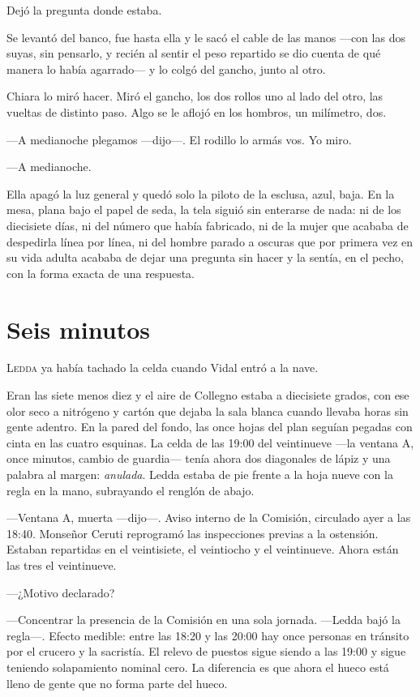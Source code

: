 Dejó la pregunta donde estaba.

Se levantó del banco, fue hasta ella y le sacó el cable de las manos ---con las dos suyas, sin pensarlo, y recién al sentir el peso repartido se dio cuenta de qué manera lo había agarrado--- y lo colgó del gancho, junto al otro.

Chiara lo miró hacer. Miró el gancho, los dos rollos uno al lado del otro, las vueltas de distinto paso. Algo se le aflojó en los hombros, un milímetro, dos.

---A medianoche plegamos ---dijo---. El rodillo lo armás vos. Yo miro.

---A medianoche.

Ella apagó la luz general y quedó solo la piloto de la esclusa, azul, baja. En la mesa, plana bajo el papel de seda, la tela siguió sin enterarse de nada: ni de los diecisiete días, ni del número que había fabricado, ni de la mujer que acababa de despedirla línea por línea, ni del hombre parado a oscuras que por primera vez en su vida adulta acababa de dejar una pregunta sin hacer y la sentía, en el pecho, con la forma exacta de una respuesta.

\clearpage

\chapter{Seis minutos}

\lettrine[lines=2, lhang=0.1, nindent=0.2em]{L}{edda} ya había tachado la celda cuando Vidal entró a la nave.


Eran las siete menos diez y el aire de Collegno estaba a diecisiete grados, con ese olor seco a nitrógeno y cartón que dejaba la sala blanca cuando llevaba horas sin gente adentro. En la pared del fondo, las once hojas del plan seguían pegadas con cinta en las cuatro esquinas. La celda de las 19:00 del veintinueve ---la ventana A, once minutos, cambio de guardia--- tenía ahora dos diagonales de lápiz y una palabra al margen: \textit{anulada}. Ledda estaba de pie frente a la hoja nueve con la regla en la mano, subrayando el renglón de abajo.

---Ventana A, muerta ---dijo---. Aviso interno de la Comisión, circulado ayer a las 18:40. Monseñor Ceruti reprogramó las inspecciones previas a la ostensión. Estaban repartidas en el veintisiete, el veintiocho y el veintinueve. Ahora están las tres el veintinueve.

---¿Motivo declarado?

---Concentrar la presencia de la Comisión en una sola jornada. ---Ledda bajó la regla---. Efecto medible: entre las 18:20 y las 20:00 hay once personas en tránsito por el crucero y la sacristía. El relevo de puestos sigue siendo a las 19:00 y sigue teniendo solapamiento nominal cero. La diferencia es que ahora el hueco está lleno de gente que no forma parte del hueco.

